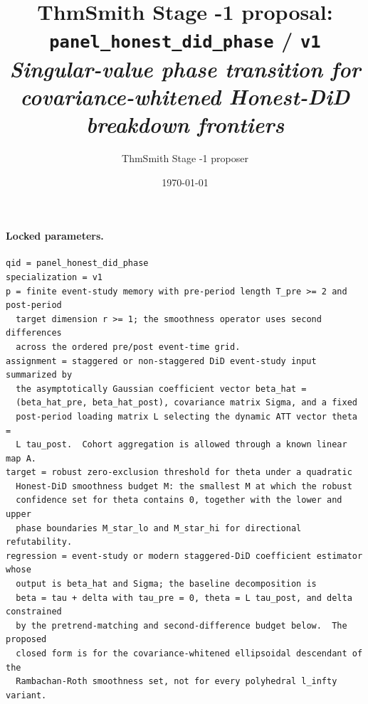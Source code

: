 \documentclass[11pt]{article}
\title{ThmSmith Stage -1 proposal: \texttt{panel\_honest\_did\_phase} / \texttt{v1}%
  \\ \large\textit{Singular-value phase transition for covariance-whitened Honest-DiD breakdown frontiers}}
\author{ThmSmith Stage -1 proposer}
\date{\today}
\theoremstyle{definition}
\theoremstyle{plain}
\theoremstyle{remark}
\begin{document}
\maketitle


\paragraph{Locked parameters.}
\begin{verbatim}
qid = panel_honest_did_phase
specialization = v1
p = finite event-study memory with pre-period length T_pre >= 2 and post-period
  target dimension r >= 1; the smoothness operator uses second differences
  across the ordered pre/post event-time grid.
assignment = staggered or non-staggered DiD event-study input summarized by
  the asymptotically Gaussian coefficient vector beta_hat =
  (beta_hat_pre, beta_hat_post), covariance matrix Sigma, and a fixed
  post-period loading matrix L selecting the dynamic ATT vector theta =
  L tau_post.  Cohort aggregation is allowed through a known linear map A.
target = robust zero-exclusion threshold for theta under a quadratic
  Honest-DiD smoothness budget M: the smallest M at which the robust
  confidence set for theta contains 0, together with the lower and upper
  phase boundaries M_star_lo and M_star_hi for directional refutability.
regression = event-study or modern staggered-DiD coefficient estimator whose
  output is beta_hat and Sigma; the baseline decomposition is
  beta = tau + delta with tau_pre = 0, theta = L tau_post, and delta constrained
  by the pretrend-matching and second-difference budget below.  The proposed
  closed form is for the covariance-whitened ellipsoidal descendant of the
  Rambachan-Roth smoothness set, not for every polyhedral l_infty variant.
\end{verbatim}
\end{document}
